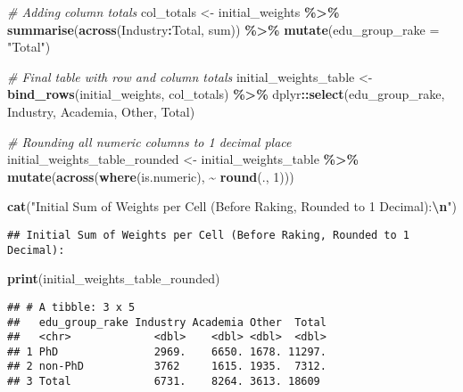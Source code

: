 \documentclass[]{article}
\newenvironment{Shaded}{\begin{snugshade}}{\end{snugshade}}
\newcommand{\AttributeTok}[1]{\textcolor[rgb]{0.13,0.29,0.53}{#1}}
\newcommand{\CommentTok}[1]{\textcolor[rgb]{0.56,0.35,0.01}{\textit{#1}}}
\newcommand{\DecValTok}[1]{\textcolor[rgb]{0.00,0.00,0.81}{#1}}
\newcommand{\FunctionTok}[1]{\textcolor[rgb]{0.13,0.29,0.53}{\textbf{#1}}}
\newcommand{\NormalTok}[1]{#1}
\newcommand{\OtherTok}[1]{\textcolor[rgb]{0.56,0.35,0.01}{#1}}
\newcommand{\SpecialCharTok}[1]{\textcolor[rgb]{0.81,0.36,0.00}{\textbf{#1}}}
\newcommand{\StringTok}[1]{\textcolor[rgb]{0.31,0.60,0.02}{#1}}
\begin{document}
\begin{Shaded}
\begin{Highlighting}[]
\CommentTok{\# Adding column totals }
\NormalTok{col\_totals }\OtherTok{\textless{}{-}}\NormalTok{ initial\_weights }\SpecialCharTok{\%\textgreater{}\%}
  \FunctionTok{summarise}\NormalTok{(}\FunctionTok{across}\NormalTok{(Industry}\SpecialCharTok{:}\NormalTok{Total, sum)) }\SpecialCharTok{\%\textgreater{}\%}
  \FunctionTok{mutate}\NormalTok{(}\AttributeTok{edu\_group\_rake =} \StringTok{"Total"}\NormalTok{)}

\CommentTok{\# Final table with row and column totals}
\NormalTok{initial\_weights\_table }\OtherTok{\textless{}{-}} \FunctionTok{bind\_rows}\NormalTok{(initial\_weights, col\_totals) }\SpecialCharTok{\%\textgreater{}\%}
\NormalTok{  dplyr}\SpecialCharTok{::}\FunctionTok{select}\NormalTok{(edu\_group\_rake, Industry, Academia, Other, Total)}

\CommentTok{\# Rounding all numeric columns to 1 decimal place}
\NormalTok{initial\_weights\_table\_rounded }\OtherTok{\textless{}{-}}\NormalTok{ initial\_weights\_table }\SpecialCharTok{\%\textgreater{}\%}
  \FunctionTok{mutate}\NormalTok{(}\FunctionTok{across}\NormalTok{(}\FunctionTok{where}\NormalTok{(is.numeric), }\SpecialCharTok{\textasciitilde{}} \FunctionTok{round}\NormalTok{(., }\DecValTok{1}\NormalTok{)))}

\FunctionTok{cat}\NormalTok{(}\StringTok{"Initial Sum of Weights per Cell (Before Raking, Rounded to 1 Decimal):}\SpecialCharTok{\textbackslash{}n}\StringTok{"}\NormalTok{)}
\end{Highlighting}
\end{Shaded}

\begin{verbatim}
## Initial Sum of Weights per Cell (Before Raking, Rounded to 1 Decimal):
\end{verbatim}

\begin{Shaded}
\begin{Highlighting}[]
\FunctionTok{print}\NormalTok{(initial\_weights\_table\_rounded)}
\end{Highlighting}
\end{Shaded}

\begin{verbatim}
## # A tibble: 3 x 5
##   edu_group_rake Industry Academia Other  Total
##   <chr>             <dbl>    <dbl> <dbl>  <dbl>
## 1 PhD               2969.    6650. 1678. 11297.
## 2 non-PhD           3762     1615. 1935.  7312.
## 3 Total             6731.    8264. 3613. 18609
\end{verbatim}
\end{document}
